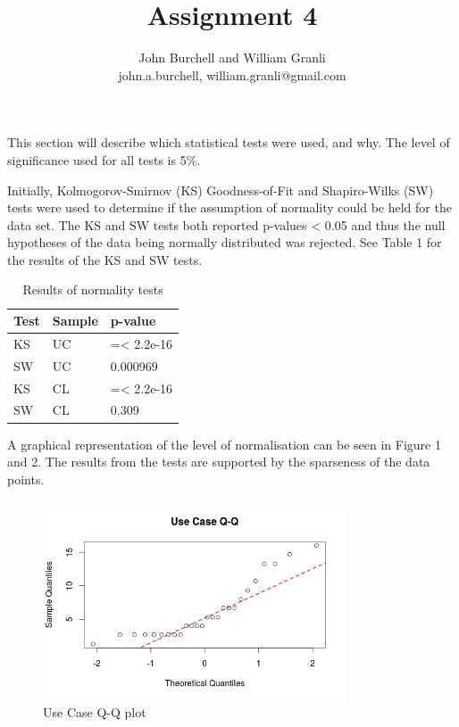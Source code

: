 \documentclass[10pt,twocolumn]{article}
\begin{document}
\title{Assignment 4}

\author{John Burchell and William Granli \\
john.a.burchell, william.granli@gmail.com}


\maketitle
\thispagestyle{empty}



This section will describe which statistical tests were used, and why. The level of significance used for all tests is 5\%. 

Initially, Kolmogorov-Smirnov (KS) Goodness-of-Fit and Shapiro-Wilks (SW) tests were used to determine if the assumption of normality could be held for the data set. The KS and SW tests both reported p-values < 0.05 and thus the null hypotheses of the data being normally distributed was rejected. See Table 1 for the results of the KS and SW tests. 

\begin{table}
	\centering
	\begin{tabular}[ht]{| l | l | l |}
	\hline
	Test & Sample & p-value  \\
	\hline
	KS & UC & =< 2.2e-16 \\
	\hline
	SW & UC & 0.000969 \\
	\hline
	KS & CL & =< 2.2e-16 \\
	\hline
	SW & CL & 0.309 \\	
	\hline
	\end{tabular}
	\caption{Results of normality tests}
\end{table}

A graphical representation of the level of normalisation can be seen in Figure 1 and 2. The results from the tests are supported by the sparseness of the data points. 

\begin{figure}[Ht!]
\centering
\includegraphics[width=90mm]{uc_qq.png}
\caption{Use Case Q-Q plot}
\end{figure}
\end{document}
